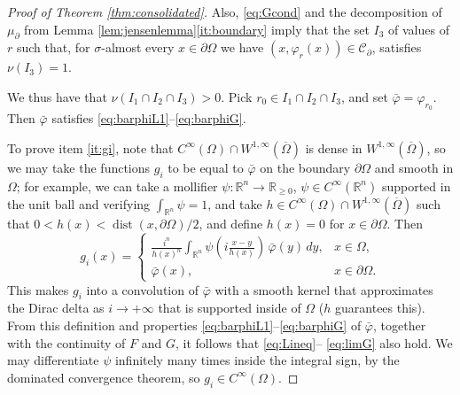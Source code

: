 \documentclass{article}
\newcommand{\R}{\mathbb{R}}
\theoremstyle{definition}
\theoremstyle{remark}
\begin{document}
\begin{proof}[Proof of Theorem \ref{thm:consolidated}]
Also, \eqref{eq:Gcond} and the  decomposition of $\mu_\partial $ from Lemma \ref{lem:jensenlemma}\ref{it:boundary} imply that the set $I_3$ of values of $r$ such that, for $\sigma$-almost every $x\in \partial\Omega$ we have
 $ (x,\varphi_r(x))\in\mathcal C_\partial$,
satisfies $\nu(I_3)=1$.

We thus have that $\nu(I_1\cap I_2\cap I_3)>0$. Pick $r_0\in I_1\cap I_2\cap I_3$, and set $\bar\varphi=\varphi_{r_0}$. Then $\bar\varphi$ satisfies \eqref{eq:barphiL1}--\eqref{eq:barphiG}.


%
%
%
%
%
%
%
%
%
%
%
%
%
%
%
%
%
%
%
%
%

%

%
%
%
%
%

%
%
%
%

%
%
%
%
%
%
%
%
%
%
%
%
%
%
%
%
%
%
%

%
%
%
%

%
%
%

%



 To prove item \ref{it:gi}, note that $C^\infty(\Omega)\cap W^{1,\infty}(\overline\Omega)$ is dense in $W^{1,\infty}(\overline\Omega)$, so we may take the functions $g_i$ to be equal to $\bar\varphi$ on the boundary $\partial\Omega$ and smooth in $\Omega$;
 for example, we can take a mollifier $\psi\colon \R^n\to \R_{\geq0}$, $\psi\in C^\infty(\R^n)$ supported in the unit ball and verifying $\int_{\R^n}\psi=1$, and take $h\in C^\infty(\Omega)\cap W^{1,\infty}(\overline\Omega)$ such that $0<h(x)<\operatorname{dist}(x,\partial\Omega)/2$, and define $h(x)=0$ for $x\in\partial\Omega$. Then
 \[g_i(x)=\begin{cases}
 \frac{i^n}{h(x)^n}\int_{\R^n}\psi\left(i\frac{x-y}{h(x)}\right)\,\bar\varphi(y)\,dy,&x\in\Omega,\\
 \bar\varphi(x),&x\in\partial \Omega.
 \end{cases}
 \]
 This makes $g_i$ into a convolution of $\bar\varphi$ with a smooth kernel that approximates the Dirac delta as $i\to+\infty$ that is supported inside of $\Omega$ ($h$ guarantees this). From this definition and  properties \eqref{eq:barphiL1}--\eqref{eq:barphiG} of $\bar\varphi$, together with the continuity of $F$ and $G$, it follows that \eqref{eq:Lineq}-- \eqref{eq:limG} also hold. We may differentiate $\psi$ infinitely many times inside the integral sign, by the dominated convergence theorem, so $g_i\in C^\infty(\Omega)$.  
 

\end{proof}
\end{document}
